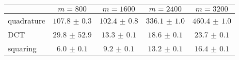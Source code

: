\centering
\renewcommand{\arraystretch}{1.2}
\begin{tabular}{@{}lcccc@{}}
\toprule
 & $m=800$ & $m=1600$ & $m=2400$ & $m=3200$\\
\midrule
quadrature & $107.8$ $\pm$ $0.3$ & $102.4$ $\pm$ $0.8$ & $336.1$ $\pm$ $1.0$ & $460.4$ $\pm$ $1.0$ \\
DCT & $29.8$ $\pm$ $52.9$ & $13.3$ $\pm$ $0.1$ & $18.6$ $\pm$ $0.1$ & $23.7$ $\pm$ $0.1$ \\
squaring & $6.0$ $\pm$ $0.1$ & $9.2$ $\pm$ $0.1$ & $13.2$ $\pm$ $0.1$ & $16.4$ $\pm$ $0.1$ \\
\bottomrule
\end{tabular}

